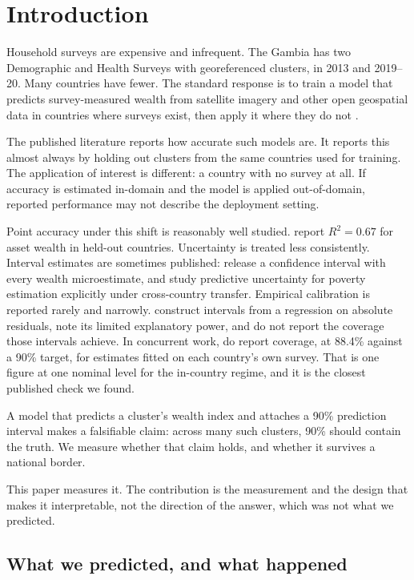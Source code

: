 \documentclass[11pt]{article}
\begin{document}
\section{Introduction}

Household surveys are expensive and infrequent. The Gambia has two Demographic
and Health Surveys with georeferenced clusters, in 2013 and 2019--20. Many
countries have fewer. The standard response is to train a model that predicts
survey-measured wealth from satellite imagery and other open geospatial data in
countries where surveys exist, then apply it where they do not
\citep{jean2016,yeh2020,chi2022}.

The published literature reports how accurate such models are. It reports this
almost always by holding out clusters from the same countries used for training.
The application of interest is different: a country with no survey at all. If
accuracy is estimated in-domain and the model is applied out-of-domain, reported
performance may not describe the deployment setting.

Point accuracy under this shift is reasonably well studied. \citet{yeh2020}
report $R^2 = 0.67$ for asset wealth in held-out countries. Uncertainty is
treated less consistently. Interval estimates are sometimes published:
\citet{chi2022} release a confidence interval with every wealth microestimate,
and \citet{kakooei2024} study predictive uncertainty for poverty estimation
explicitly under cross-country transfer. Empirical calibration is reported
rarely and narrowly. \citet{chi2022} construct intervals from a regression on
absolute residuals, note its limited explanatory power, and do not report the
coverage those intervals achieve. In concurrent work, \citet{olanrewaju2026} do
report coverage, at 88.4\% against a 90\% target, for estimates fitted on each
country's own survey. That is one figure at one nominal level for the in-country
regime, and it is the closest published check we found.

A model that predicts a cluster's wealth index and attaches a 90\% prediction
interval makes a falsifiable claim: across many such clusters, 90\% should
contain the truth. We measure whether that claim holds, and whether it survives
a national border.

This paper measures it. The contribution is the measurement and the design that
makes it interpretable, not the direction of the answer, which was not what we
predicted.

\subsection{What we predicted, and what happened}
\end{document}
